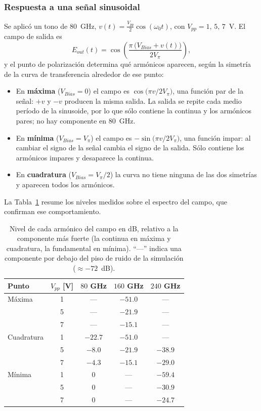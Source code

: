 \subsubsection*{Respuesta a una señal sinusoidal}

Se aplicó un tono de $80$~GHz, $v(t) = \tfrac{V_{pp}}{2}\cos(\omega_0 t)$,
con $V_{pp} = 1,\,5,\,7$~V. El campo de salida es
%
\begin{equation}
E_{out}(t) = \cos\!\left(\frac{\pi\,\big(V_{Bias} + v(t)\big)}{2V_\pi}\right),
\end{equation}
%
y el punto de polarización determina qué armónicos aparecen, según la
simetría de la curva de transferencia alrededor de ese punto:
%
\begin{itemize}\itemsep2pt
\item En \textbf{máxima} ($V_{Bias} = 0$) el campo es
      $\cos\!\big(\pi v/2V_\pi\big)$, una función par de la señal:
      $+v$ y $-v$ producen la misma salida. La salida se repite cada medio
      período de la sinusoide, por lo que sólo contiene la continua y los
      armónicos pares; no hay componente en $80$~GHz.
\item En \textbf{mínima} ($V_{Bias} = V_\pi$) el campo es
      $-\sin\!\big(\pi v/2V_\pi\big)$, una función impar: al cambiar
      el signo de la señal cambia el signo de la salida. Sólo contiene los
      armónicos impares y desaparece la continua.
\item En \textbf{cuadratura} ($V_{Bias} = V_\pi/2$) la curva no tiene
      ninguna de las dos simetrías y aparecen todos los armónicos.
\end{itemize}
%
La Tabla~\ref{tab:ej3_armonicos} resume los niveles medidos sobre el
espectro del campo, que confirman ese comportamiento.

\begin{table}[H]
\centering
\small
\begin{tabular}{lcccc}
\toprule
Punto & $V_{pp}$ [V] & $80$ GHz & $160$ GHz & $240$ GHz \\
\midrule
Máxima     & 1 & ---     & $-51.0$ & --- \\
           & 5 & ---     & $-21.9$ & --- \\
           & 7 & ---     & $-15.1$ & --- \\
\midrule
Cuadratura & 1 & $-22.7$ & $-51.0$ & --- \\
           & 5 & $-8.0$  & $-21.9$ & $-38.9$ \\
           & 7 & $-4.3$  & $-15.1$ & $-29.0$ \\
\midrule
Mínima     & 1 & $0$     & ---     & $-59.4$ \\
           & 5 & $0$     & ---     & $-30.9$ \\
           & 7 & $0$     & ---     & $-24.7$ \\
\bottomrule
\end{tabular}
\caption{Nivel de cada armónico del campo en dB, relativo a la componente
más fuerte (la continua en máxima y cuadratura, la fundamental en mínima).
``---'' indica una componente por debajo del piso de ruido de la simulación
($\approx -72$~dB).}
\label{tab:ej3_armonicos}
\end{table}

